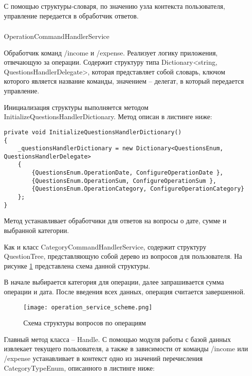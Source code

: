 С помощью структуры-словаря, по значению узла контекста
пользователя, управление передается в обработчик ответов.

\subsubsection{} OperationCommandHandlerService
\label{sec:design:server:OperationCommandHandlerService}

Обработчик команд /income и /expense. Реализует логику приложения,
отвечающую за операции. Содержит структуру типа Dictionary<string,
QuestionsHandlerDelegate>, которая представляет собой словарь, ключом
которого является название команды, значением – делегат, в который
передается управление.

\vskip 1in

Инициализация структуры выполняется методом \linebreak
InitializeQuestionsHandlerDictionary. Метод описан в листинге ниже:

\lstset{style=sharpc}
\begin{lstlisting}
private void InitializeQuestionsHandlerDictionary()
{
	_questionsHandlerDictionary = new Dictionary<QuestionsEnum, QuestionsHandlerDelegate>
	{
		{QuestionsEnum.OperationDate, ConfigureOperationDate },
		{QuestionsEnum.OperationSum, ConfigureOperationSum },
		{QuestionsEnum.OperationCategory, ConfigureOperationCategory}
	};
}
\end{lstlisting}

Метод устанавливает обработчики для ответов на вопросы о дате, сумме и выбранной категории. 

Как и класс CategoryCommandHandlerService, содержит структуру
\linebreak QuestionTree, представляющую собой дерево из вопросов для пользователя. На рисунке \ref{fig:design:server:operation_service_scheme} представлена схема данной структуры.

В начале выбирается категория для операции, далее запрашивается
сумма операции и дата. После введения всех данных, операция считается завершенной.

\begin{figure}[!h]
\centering
	\texttt{[image: operation\_service\_scheme.png]}
	\caption{Схема структуры вопросов по операциям}
	\label{fig:design:server:operation_service_scheme}
\end{figure}

Главный метод класса – Handle. С помощью модуля работы с базой
данных извлекает текущего пользователя, а также в зависимости от команды /income или /expense устанавливает в контекст одно из значений перечисления CategoryTypeEnum, описанного в листинге ниже:

